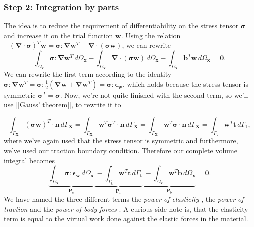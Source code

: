 \documentclass[acmtog]{acmart}
\begin{document}
\subsubsection{Step 2: Integration by parts}
The idea is to reduce the requirement of differentiability on the stress tensor $\boldsymbol \sigma$ and increase it on the trial function $\boldsymbol w$. Using the relation $- (\boldsymbol \nabla \cdot \boldsymbol \sigma)^T \boldsymbol w= \boldsymbol \sigma : \boldsymbol \nabla \boldsymbol w^T - \boldsymbol \nabla \cdot (\boldsymbol \sigma \boldsymbol w)$, we can rewrite
%
\begin{equation}
  \int_{\Omega_{\boldsymbol x}} \boldsymbol \sigma : \boldsymbol \nabla \boldsymbol w^T \, d\Omega_{\boldsymbol x} - \int_{\Omega_{\boldsymbol x}} \boldsymbol \nabla \cdot (\boldsymbol \sigma \boldsymbol w) \, d\Omega_{\boldsymbol x} - \int_{\Omega_{\boldsymbol x}} \boldsymbol b^T \boldsymbol w \, d\Omega_{\boldsymbol x} = \boldsymbol 0.
\end{equation}
%
We can rewrite the first term according to the identity $\boldsymbol \sigma :
  \boldsymbol \nabla \boldsymbol w^T = \boldsymbol \sigma : \frac{1}{2}
  (\boldsymbol \nabla \boldsymbol w + \boldsymbol \nabla \boldsymbol w^T) =
  \boldsymbol\sigma : \boldsymbol \epsilon_{\boldsymbol w}$, which holds because the
stress tensor is symmetric $\boldsymbol\sigma^T = \boldsymbol\sigma$. Now,
we're not quite finished with the second term, so we'll use [[Gauss' theorem]],
to rewrite it to

%
\begin{equation}
  \int_{\Gamma_{\boldsymbol X}} (\boldsymbol \sigma \boldsymbol w)^T \cdot\boldsymbol n \, d\Gamma_{\boldsymbol X} = \int_{\Gamma_{\boldsymbol X}} \boldsymbol w^T \boldsymbol \sigma^T \cdot\boldsymbol n \, d\Gamma_{\boldsymbol X} = \int_{\Gamma_{\boldsymbol X}} \boldsymbol w^T \boldsymbol \sigma \cdot\boldsymbol n \, d\Gamma_{\boldsymbol X} = \int_{\Gamma_{\boldsymbol t}} \boldsymbol w^T \boldsymbol t \, d\Gamma_{\boldsymbol t},
\end{equation}
%
where we've again used that the stress tensor is symmetric and furthermore,
we've used our traction boundary condition. Therefore our complete volume
integral becomes
%
\begin{equation}
  \underbrace{ \int_{\Omega_{\boldsymbol x}} \boldsymbol \sigma : \boldsymbol \epsilon_{\boldsymbol w} \, d\Omega_{\boldsymbol x} }_{ \boldsymbol P_e } \underbrace{\ - \int_{\Gamma_{\boldsymbol t}} \boldsymbol w^T \boldsymbol t \, d\Gamma_{\boldsymbol t} }_{ \boldsymbol P_t } \underbrace{\ - \int_{\Omega_{\boldsymbol x}} \boldsymbol w^T \boldsymbol b \, d\Omega_{\boldsymbol x} }_{ \boldsymbol P_b } = \boldsymbol 0.
\end{equation}
%
We have named the three different terms the \textit{power of elasticity} , the \textit{power
of traction}  and the \textit{power of body forces} . A curious side note is, that the
elasticity term is equal to the virtual work done against the elastic forces in
the material.
\end{document}
